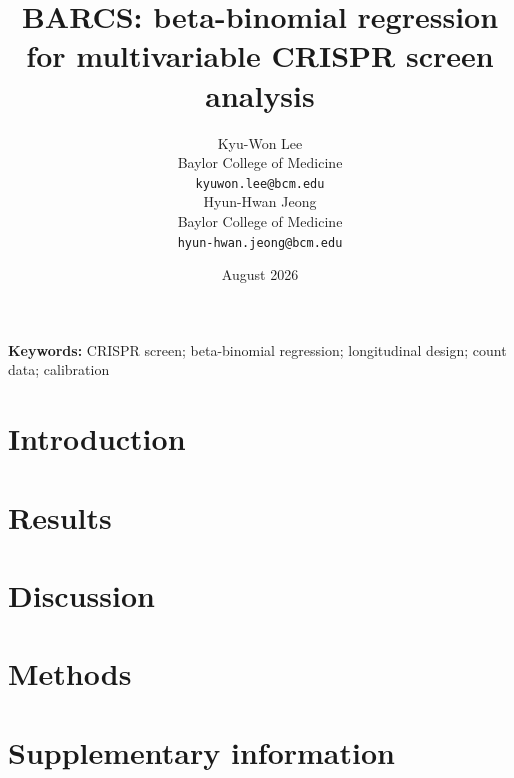 \documentclass[11pt]{article}
\title{BARCS: beta-binomial regression for multivariable CRISPR screen analysis}
\author{Kyu-Won Lee\\
\normalsize Baylor College of Medicine\\
\normalsize \texttt{kyuwon.lee@bcm.edu} \\
Hyun-Hwan Jeong\\
\normalsize Baylor College of Medicine\\
\normalsize \texttt{hyun-hwan.jeong@bcm.edu}}
\date{August 2026}
\begin{document}
\maketitle



\noindent\textbf{Keywords:} CRISPR screen; beta-binomial regression;
longitudinal design; count data; calibration
\vspace{0.18in}

\section{Introduction}


\section{Results}



\section{Discussion}


\section{Methods}






\clearpage
\appendix
\section{Supplementary information}

\end{document}
